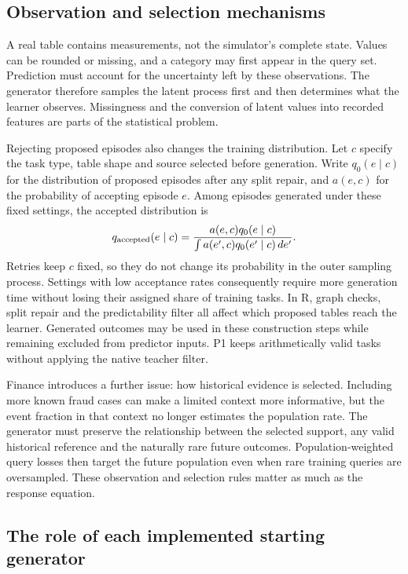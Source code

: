 \documentclass[11pt]{article}
\begin{document}
\subsection{Observation and selection mechanisms}

A real table contains measurements, not the simulator's complete state. Values can be rounded or missing, and a category may first appear in the query set. Prediction must account for the uncertainty left by these observations. The generator therefore samples the latent process first and then determines what the learner observes. Missingness and the conversion of latent values into recorded features are parts of the statistical problem.

Rejecting proposed episodes also changes the training distribution. Let $c$ specify the task type, table shape and source selected before generation. Write $q_0(e\mid c)$ for the distribution of proposed episodes after any split repair, and $a(e,c)$ for the probability of accepting episode $e$. Among episodes generated under these fixed settings, the accepted distribution is
\[
 q_{\rm accepted}(e\mid c)=
 \frac{a(e,c)q_0(e\mid c)}{\int a(e',c)q_0(e'\mid c)\,de'}.
\]
Retries keep $c$ fixed, so they do not change its probability in the outer sampling process. Settings with low acceptance rates consequently require more generation time without losing their assigned share of training tasks. In R, graph checks, split repair and the predictability filter all affect which proposed tables reach the learner. Generated outcomes may be used in these construction steps while remaining excluded from predictor inputs. P1 keeps arithmetically valid tasks without applying the native teacher filter.

Finance introduces a further issue: how historical evidence is selected. Including more known fraud cases can make a limited context more informative, but the event fraction in that context no longer estimates the population rate. The generator must preserve the relationship between the selected support, any valid historical reference and the naturally rare future outcomes. Population-weighted query losses then target the future population even when rare training queries are oversampled. These observation and selection rules matter as much as the response equation.

\subsection{The role of each implemented starting generator}
\end{document}
